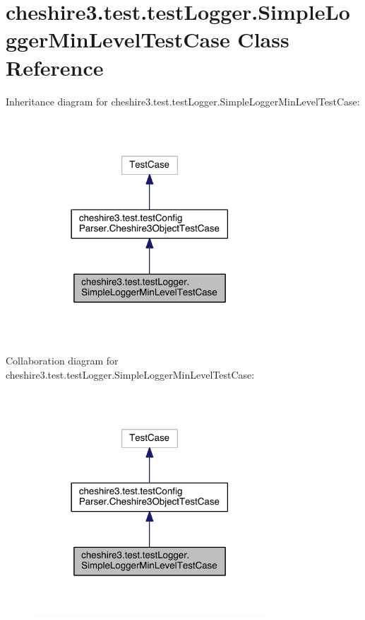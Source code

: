 \hypertarget{classcheshire3_1_1test_1_1test_logger_1_1_simple_logger_min_level_test_case}{\section{cheshire3.\-test.\-test\-Logger.\-Simple\-Logger\-Min\-Level\-Test\-Case Class Reference}
\label{classcheshire3_1_1test_1_1test_logger_1_1_simple_logger_min_level_test_case}
}


Inheritance diagram for cheshire3.\-test.\-test\-Logger.\-Simple\-Logger\-Min\-Level\-Test\-Case\-:
\nopagebreak
\begin{figure}[H]
\begin{center}
\leavevmode
\includegraphics[width=246pt]{classcheshire3_1_1test_1_1test_logger_1_1_simple_logger_min_level_test_case__inherit__graph}
\end{center}
\end{figure}


Collaboration diagram for cheshire3.\-test.\-test\-Logger.\-Simple\-Logger\-Min\-Level\-Test\-Case\-:
\nopagebreak
\begin{figure}[H]
\begin{center}
\leavevmode
\includegraphics[width=246pt]{classcheshire3_1_1test_1_1test_logger_1_1_simple_logger_min_level_test_case__coll__graph}
\end{center}
\end{figure}
